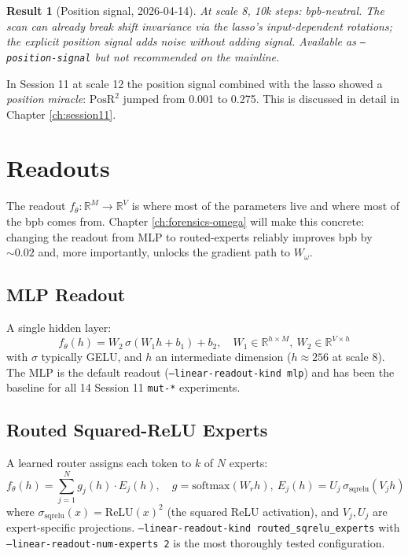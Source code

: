\documentclass[11pt,openany]{book}
\theoremstyle{definition}
\theoremstyle{plain}
\newtheorem{result}{Result}[chapter]
\newcommand{\posr}{\mathrm{PosR^2}}
\newcommand{\omegaproj}{W_\omega}
\begin{document}
\begin{result}[Position signal, 2026-04-14]
At scale 8, 10k steps: bpb-neutral. The scan can already break shift
invariance via the lasso's input-dependent rotations; the explicit
position signal adds noise without adding signal. Available as
\texttt{--position-signal} but not recommended on the mainline.
\end{result}

In Session 11 at scale 12 the position signal combined with the lasso
showed a \emph{position miracle}: $\posr$ jumped from 0.001 to 0.275. This
is discussed in detail in Chapter \ref{ch:session11}.

\chapter{Readouts}
\label{ch:readouts}

The readout $f_\theta: \mathbb{R}^M \to \mathbb{R}^V$ is where most of the
parameters live and where most of the bpb comes from. Chapter
\ref{ch:forensics-omega} will make this concrete: changing the readout
from MLP to routed-experts reliably improves bpb by $\sim 0.02$ and,
more importantly, unlocks the gradient path to $\omegaproj$.

\section{MLP Readout}

A single hidden layer:
\begin{equation}
  f_\theta(h) = W_2 \,\sigma(W_1 h + b_1) + b_2,
  \quad W_1 \in \mathbb{R}^{h \times M},\ W_2 \in \mathbb{R}^{V \times h}
\end{equation}
with $\sigma$ typically GELU, and $h$ an intermediate dimension ($h \approx
256$ at scale 8). The MLP is the default readout (\texttt{--linear-readout-kind
mlp}) and has been the baseline for all 14 Session 11 \texttt{mut-*}
experiments.

\section{Routed Squared-ReLU Experts}

A learned router assigns each token to $k$ of $N$ experts:
\begin{equation}
  f_\theta(h) = \sum_{j=1}^N g_j(h) \cdot E_j(h),
  \quad g = \mathrm{softmax}(W_r h),\ E_j(h) = U_j\,\sigma_{\text{sqrelu}}(V_j h)
\end{equation}
where $\sigma_{\text{sqrelu}}(x) = \mathrm{ReLU}(x)^2$ (the squared ReLU
activation), and $V_j, U_j$ are expert-specific projections.
\texttt{--linear-readout-kind routed\_sqrelu\_experts} with
\texttt{--linear-readout-num-experts 2} is the most thoroughly tested
configuration.
\end{document}
